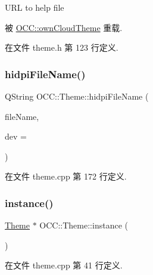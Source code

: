 U\+RL to help file 

被 \hyperlink{class_o_c_c_1_1own_cloud_theme_a30a50cd11d5c7a354ef47412741d96e4}{O\+C\+C\+::own\+Cloud\+Theme} 重载.



在文件 theme.\+h 第 123 行定义.

\mbox{\label{class_o_c_c_1_1_theme_a654abbe3f9136fa84fa1e49fe73445fc}} 
\subsubsection{\texorpdfstring{hidpi\+File\+Name()}{hidpiFileName()}}
{\footnotesize\ttfamily Q\+String O\+C\+C\+::\+Theme\+::hidpi\+File\+Name (\begin{DoxyParamCaption}\item[{const Q\+String \&}]{file\+Name,  }\item[{Q\+Paint\+Device $\ast$}]{dev = {} }\end{DoxyParamCaption})\hspace{0.3cm}{\ttfamily [static]}}



在文件 theme.\+cpp 第 172 行定义.

\mbox{\label{class_o_c_c_1_1_theme_acd2ed433148391dd4993d76cb281a596}} 
\subsubsection{\texorpdfstring{instance()}{instance()}}
{\footnotesize\ttfamily \hyperlink{class_o_c_c_1_1_theme}{Theme} $\ast$ O\+C\+C\+::\+Theme\+::instance (\begin{DoxyParamCaption}{ }\end{DoxyParamCaption})\hspace{0.3cm}{\ttfamily [static]}}



在文件 theme.\+cpp 第 41 行定义.

\mbox{\label{class_o_c_c_1_1_theme_a4860bc1081f2e9c0ea8c1ad02be80927}} 
